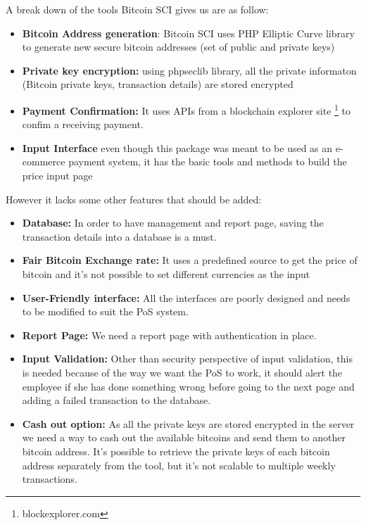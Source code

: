 A break down of the tools Bitcoin SCI gives us are as follow:
\begin{itemize}
\item \textbf{Bitcoin Address generation}:  Bitcoin SCI uses PHP Elliptic Curve library to generate new secure bitcoin addresses (set of public and private keys)
\item \textbf{Private key encryption: } using phpseclib library, all the private informaton (Bitcoin private keys, transaction details) are stored encrypted
\item \textbf{Payment Confirmation: } It uses APIs from a blockchain explorer site \footnote{blockexplorer.com} to confim a receiving payment.
\item \textbf{Input Interface} even though this package was meant to be used as an e-commerce payment system, it has the basic tools and methods to build the price input page
\end{itemize}

However it lacks some other features that should be added:
\begin{itemize}

\item \textbf{Database: } In order to have management and report page, saving the transaction details into a database is a must.
\item \textbf{Fair Bitcoin Exchange rate: } It uses a predefined source to get the price of bitcoin and it's not possible to set different currencies as the input
\item \textbf{User-Friendly interface: } All the interfaces are poorly designed and needs to be modified to suit the PoS system.
\item \textbf {Report Page: } We need a report page with authentication in place.
\item \textbf {Input Validation: } Other than security perspective of input validation, this is needed because of the way we want the PoS to work, it should alert the employee if she has done something wrong before going to the next page and adding a failed transaction to the database.
\item \textbf {Cash out option: } As all the private keys are stored encrypted in the server we need a way to cash out the available bitcoins and send them to another bitcoin address. It's possible to retrieve the private keys of each bitcoin address separately from the tool, but it's not scalable to multiple weekly transactions.
\end{itemize}

